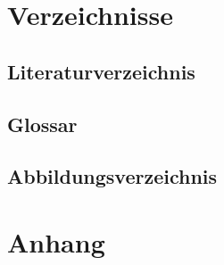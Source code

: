 \documentclass[a4paper]{article}
\begin{document}
	\section{Verzeichnisse}
	\subsection{Literaturverzeichnis}
	\subsection{Glossar}
	\subsection{Abbildungsverzeichnis}
	\section{Anhang}
		
		
		
\end{document}
